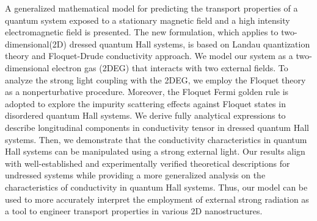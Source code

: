 A generalized mathematical model for predicting the transport properties of a quantum system exposed to a stationary magnetic field and a high intensity electromagnetic field is presented. The new formulation, which applies to two-dimensional(2D) dressed quantum Hall systems, is based on Landau quantization theory and Floquet-Drude conductivity approach.
We model our system as a two-dimensional electron gas (2DEG) that interacts with two external fields. To analyze the strong light coupling with the 2DEG, we employ the Floquet theory as a nonperturbative procedure. Moreover, the Floquet Fermi golden rule is adopted to explore the impurity scattering effects against Floquet states in disordered quantum Hall systems.
We derive fully analytical expressions to describe longitudinal components in conductivity tensor in dressed quantum Hall systems. Then, we demonstrate that the conductivity characteristics in quantum Hall systems can be manipulated using a strong external light.
Our results align with well-established and experimentally
verified theoretical descriptions for undressed systems while providing a more generalized analysis on the characteristics of conductivity in quantum Hall systems.
Thus, our model can be used to more accurately interpret the employment of external strong radiation as a tool to engineer transport properties in various 2D nanostructures.
